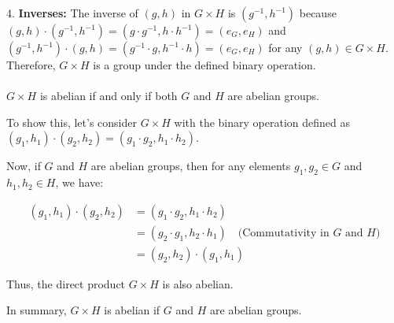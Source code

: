 \documentclass[11pt]{article}
\begin{document}
{\begin{minipage}{0.98\linewidth}
        4. \textbf{Inverses:} The inverse of $(g, h)$ in $G \times H$ is $(g^{-1}, h^{-1})$ because $(g, h) \cdot (g^{-1}, h^{-1}) = (g \cdot g^{-1}, h \cdot h^{-1}) = (e_G, e_H)$ and $(g^{-1}, h^{-1}) \cdot (g, h) = (g^{-1} \cdot g, h^{-1} \cdot h) = (e_G, e_H)$ for any $(g, h) \in G \times H$. \\
        Therefore, $G \times H$ is a group under the defined binary operation.\\ \\

        \(G \times H\) is abelian if and only if both \(G\) and \(H\) are abelian groups.

        To show this, let's consider \(G \times H\) with the binary operation defined as \((g_1, h_1) \cdot (g_2, h_2) = (g_1 \cdot g_2, h_1 \cdot h_2)\).
        
        Now, if \(G\) and \(H\) are abelian groups, then for any elements \(g_1, g_2 \in G\) and \(h_1, h_2 \in H\), we have:

        \vspace{-1em}
        \begin{align*}
        (g_1, h_1) \cdot (g_2, h_2) &= (g_1 \cdot g_2, h_1 \cdot h_2) \\
        &= (g_2 \cdot g_1, h_2 \cdot h_1) \quad \text{(Commutativity in \(G\) and \(H\))} \\
        &= (g_2, h_2) \cdot (g_1, h_1)
        \end{align*}
        
        Thus, the direct product \(G \times H\) is also abelian.
        
        In summary, \(G \times H\) is abelian if \(G\) and \(H\) are abelian groups.
    \end{minipage}
}
\end{document}
